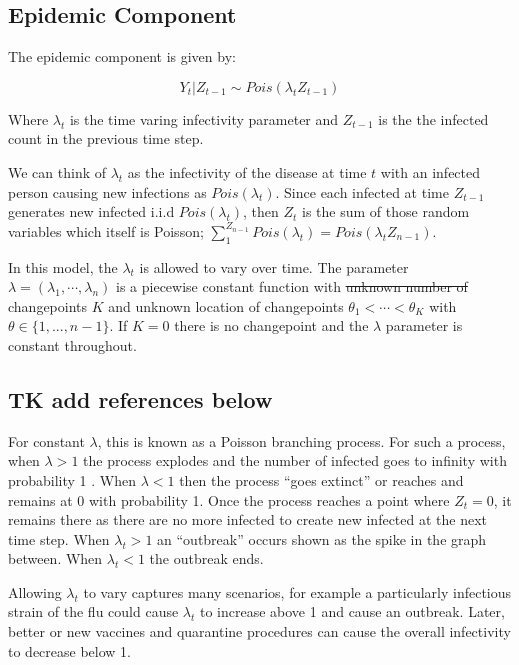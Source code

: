 \documentclass[]{article}
\numberwithin{equation}{section}
\newcommand{\dw}[1]{{\color{red}{#1}}}
\begin{document}
\hypertarget{epidemic-component}{%
\subsection{Epidemic Component}\label{epidemic-component}}

The epidemic component is given by:

\[Y_t|Z_{t-1} \sim Pois(\lambda_tZ_{t-1})\]

Where \(\lambda_t\) is the time varing infectivity parameter and
\(Z_{t-1}\) is the the infected count in the previous time step.

We can think of \(\lambda_t\) as the infectivity of the disease at time
\(t\) with an infected person causing new infections as
\(Pois(\lambda_t)\). Since each infected at time \(Z_{t-1}\) generates
new infected i.i.d \(Pois(\lambda_t)\), then \(Z_t\) is the sum of those
random variables which itself is Poisson;
\(\sum_1^{Z_{n-1}}Pois(\lambda_t) = Pois(\lambda_tZ_{n-1})\).

In this model, the \(\lambda_t\) is allowed to vary over time. The
parameter \(\lambda = (\lambda_1,\cdots,\lambda_n)\) is a piecewise
constant function with \st{unknown number of} changepoints \(K\) and unknown
location of changepoints \(\theta_1 < \cdots < \theta_K\) with
\(\theta \in \{1,...,n-1\}\). If \(K = 0\) there is no changepoint and
the \(\lambda\) parameter is constant throughout.

\hypertarget{tk-add-references-below}{%
\subsection{TK add references below}\label{tk-add-references-below}}

For constant \(\lambda\), this is known as a Poisson branching process.
For such a process, when \(\lambda > 1\) the process explodes and the
number of infected goes to infinity with probability 1 \dw{not probability 1 - can still die out, right?}. When
\(\lambda < 1\) then the process ``goes extinct'' or reaches and remains
at 0 with probability 1. Once the process reaches a point where
\(Z_t = 0\), it remains there as there are no more infected to create
new infected at the next time step. When \(\lambda_t > 1\) an
``outbreak'' occurs shown as the spike in the graph between. When
\(\lambda_t < 1\) the outbreak ends.

Allowing \(\lambda_t\) to vary captures many scenarios, for example a
particularly infectious strain of the flu could cause \(\lambda_t\) to
increase above 1 and cause an outbreak. Later, better or new vaccines
and quarantine procedures can cause the overall infectivity to decrease
below 1.
\end{document}
